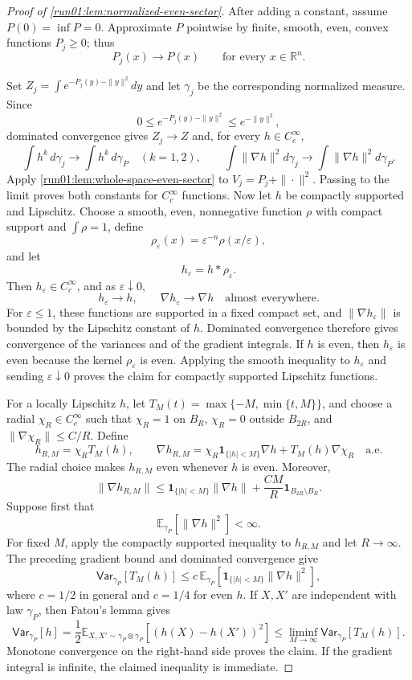 \documentclass[11pt]{article}
\numberwithin{equation}{section}
\theoremstyle{definition}
\newcommand{\E}[2]{\mathbb{E}_{#1}\left[#2\right]}
\newcommand{\V}[2]{\mathsf{Var}_{#1}\left[#2\right]}
\begin{document}
\begin{proof}[Proof of \cref{run01:lem:normalized-even-sector}]
After adding a constant, assume $P(0)=\inf P=0$.
Approximate $P$ pointwise by finite, smooth, even, convex functions
$P_j\geq0$; thus
\[
 P_j(x)\longrightarrow P(x)
 \qquad\text{for every }x\in\mathbb R^n.
\]

Set $Z_j=\int e^{-P_j(y)-\|y\|^2}dy$ and let
$\gamma_j$ be the corresponding normalized measure.
Since
\[
0
\leq e^{-P_j(y)-\|y\|^2}
\leq e^{-\|y\|^2},
\]
dominated convergence gives $Z_j\to Z$ and, for every
$h\in C_c^\infty$,
\[
 \int h^k\,d\gamma_j\to\int h^k\,d\gamma_P\quad(k=1,2),
 \qquad
 \int\|\nabla h\|^2d\gamma_j
 \to\int\|\nabla h\|^2d\gamma_P.
\]
Apply \cref{run01:lem:whole-space-even-sector} to $V_j=P_j+\|\cdot\|^2$.
Passing to the limit proves both constants for $C_c^\infty$ functions.
Now let $h$ be compactly supported and Lipschitz.
Choose a smooth, even, nonnegative function $\rho$ with compact support and
$\int\rho=1$, define
\[
 \rho_\varepsilon(x)=\varepsilon^{-n}\rho(x/\varepsilon),
\]
and let
\[
 h_\varepsilon=h*\rho_\varepsilon.
\]
Then $h_\varepsilon\in C_c^\infty$, and as
$\varepsilon\downarrow0$,
\[
 h_\varepsilon\to h,
 \qquad
 \nabla h_\varepsilon\to\nabla h
 \quad\text{almost everywhere}.
\]
For $\varepsilon\leq1$, these functions are supported in a fixed compact set,
and
$\|\nabla h_\varepsilon\|$ is bounded by the Lipschitz constant of
$h$.
Dominated convergence therefore gives convergence of the variances and of the
gradient integrals.
If $h$ is even, then
$h_\varepsilon$ is even because the kernel
$\rho_\varepsilon$ is even.
Applying the smooth inequality to $h_\varepsilon$ and sending
$\varepsilon\downarrow0$ proves the claim for compactly supported Lipschitz
functions.

For a locally Lipschitz $h$, let
$T_M(t)=\max\{-M,\min\{t,M\}\}$, and choose a radial
$\chi_R\in C_c^\infty$ such that
$\chi_R=1$ on
$B_R$,
$\chi_R=0$ outside
$B_{2R}$, and
$\|\nabla\chi_R\|\leq C/R$.
Define
\[
h_{R,M}=\chi_R T_M(h),
\qquad
\nabla h_{R,M} =\chi_R\mathbf 1_{\{|h|<M\}}\nabla h+T_M(h)\nabla\chi_R
\quad
\text{a.e.}
\]
The radial choice makes $h_{R,M}$ even whenever
$h$ is even.
Moreover,
\[
 \|\nabla h_{R,M}\|
 \leq \mathbf 1_{\{|h|<M\}}\|\nabla h\|
 +\frac{CM}{R}\mathbf 1_{B_{2R}\setminus B_R}.
\]
Suppose first that
\[
 \E{\gamma_P}{\|\nabla h\|^2}<\infty.
\]
For fixed $M$, apply the compactly supported inequality to
$h_{R,M}$ and let
$R\to\infty$.
The preceding gradient bound and dominated convergence give
\[
 \V{\gamma_P}{T_M(h)}
 \leq c\,\E{\gamma_P}
 {\mathbf 1_{\{|h|<M\}}\|\nabla h\|^2},
\]
where $c=1/2$ in general and
$c=1/4$ for even
$h$.
If $X,X'$ are independent with law
$\gamma_P$, then Fatou's lemma gives
\[
\V{\gamma_P}{h}
=\frac12\E{X,X'\sim\gamma_P\otimes\gamma_P}{(h(X)-h(X'))^2}
\leq\liminf_{M\to\infty} \V{\gamma_P}{T_M(h)}.
\]
Monotone convergence on the right-hand side proves the claim.
If the gradient integral is infinite, the claimed inequality is immediate.
\end{proof}
\end{document}
